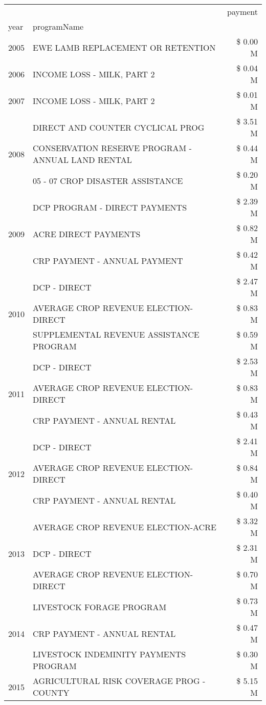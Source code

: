 \begin{tabular}{llr}
\toprule
 &  & payment \\
year & programName &  \\
\midrule
2005 & EWE LAMB REPLACEMENT OR RETENTION & \$ 0.00 M \\
\cline{1-3}
2006 & INCOME LOSS - MILK, PART 2 & \$ 0.04 M \\
\cline{1-3}
2007 & INCOME LOSS - MILK, PART 2 & \$ 0.01 M \\
\cline{1-3}
\multirow[t]{3}{*}{2008} & DIRECT AND COUNTER CYCLICAL PROG & \$ 3.51 M \\
 & CONSERVATION RESERVE PROGRAM - ANNUAL LAND RENTAL & \$ 0.44 M \\
 & 05 - 07 CROP DISASTER ASSISTANCE & \$ 0.20 M \\
\cline{1-3}
\multirow[t]{3}{*}{2009} & DCP PROGRAM - DIRECT PAYMENTS & \$ 2.39 M \\
 & ACRE DIRECT PAYMENTS & \$ 0.82 M \\
 & CRP PAYMENT - ANNUAL PAYMENT & \$ 0.42 M \\
\cline{1-3}
\multirow[t]{3}{*}{2010} & DCP - DIRECT & \$ 2.47 M \\
 & AVERAGE CROP REVENUE ELECTION-DIRECT & \$ 0.83 M \\
 & SUPPLEMENTAL REVENUE ASSISTANCE PROGRAM & \$ 0.59 M \\
\cline{1-3}
\multirow[t]{3}{*}{2011} & DCP - DIRECT & \$ 2.53 M \\
 & AVERAGE CROP REVENUE ELECTION-DIRECT & \$ 0.83 M \\
 & CRP PAYMENT - ANNUAL RENTAL & \$ 0.43 M \\
\cline{1-3}
\multirow[t]{3}{*}{2012} & DCP - DIRECT & \$ 2.41 M \\
 & AVERAGE CROP REVENUE ELECTION-DIRECT & \$ 0.84 M \\
 & CRP PAYMENT - ANNUAL RENTAL & \$ 0.40 M \\
\cline{1-3}
\multirow[t]{3}{*}{2013} & AVERAGE CROP REVENUE ELECTION-ACRE & \$ 3.32 M \\
 & DCP - DIRECT & \$ 2.31 M \\
 & AVERAGE CROP REVENUE ELECTION-DIRECT & \$ 0.70 M \\
\cline{1-3}
\multirow[t]{3}{*}{2014} & LIVESTOCK FORAGE PROGRAM & \$ 0.73 M \\
 & CRP PAYMENT - ANNUAL RENTAL & \$ 0.47 M \\
 & LIVESTOCK INDEMINITY PAYMENTS PROGRAM & \$ 0.30 M \\
\cline{1-3}
\multirow[t]{3}{*}{2015} & AGRICULTURAL RISK COVERAGE PROG - COUNTY & \$ 5.15 M \\

\end{tabular}
